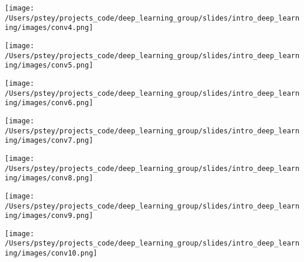 \documentclass[pdf]{beamer}
\begin{document}
	\begin{frame}
	\begin{center}
		\texttt{[image: /Users/pstey/projects\_code/deep\_learning\_group/slides/intro\_deep\_learning/images/conv4.png]}
	\end{center}
	\end{frame}

	\begin{frame}
	\begin{center}
		\texttt{[image: /Users/pstey/projects\_code/deep\_learning\_group/slides/intro\_deep\_learning/images/conv5.png]}
	\end{center}
	\end{frame}
	
	\begin{frame}
	\begin{center}
		\texttt{[image: /Users/pstey/projects\_code/deep\_learning\_group/slides/intro\_deep\_learning/images/conv6.png]}
	\end{center}
	\end{frame}
		
	\begin{frame}
	\begin{center}
		\texttt{[image: /Users/pstey/projects\_code/deep\_learning\_group/slides/intro\_deep\_learning/images/conv7.png]}
	\end{center}
	\end{frame}
		
	\begin{frame}
	\begin{center}
		\texttt{[image: /Users/pstey/projects\_code/deep\_learning\_group/slides/intro\_deep\_learning/images/conv8.png]}
	\end{center}
	\end{frame}


	\begin{frame}
	\begin{center}
		\texttt{[image: /Users/pstey/projects\_code/deep\_learning\_group/slides/intro\_deep\_learning/images/conv9.png]}
	\end{center}
	\end{frame}
	
	\begin{frame}
	\begin{center}
		\texttt{[image: /Users/pstey/projects\_code/deep\_learning\_group/slides/intro\_deep\_learning/images/conv10.png]}
	\end{center}
	\end{frame}
		
\end{document}
